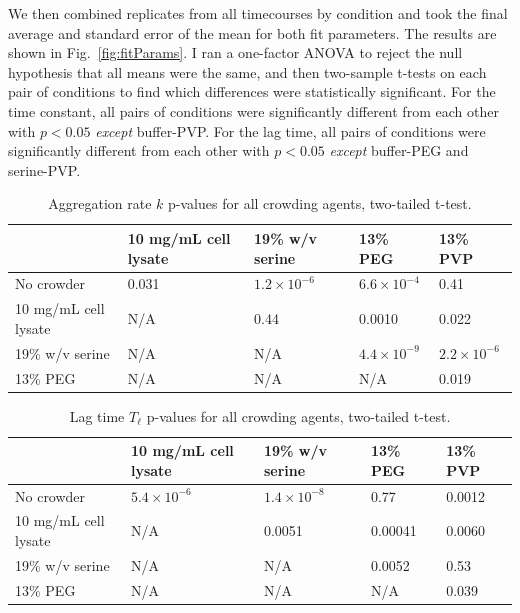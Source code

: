 
We then combined replicates from all timecourses by condition and took the final average and standard error of the mean for both fit parameters.  The results are shown in Fig.~\ref{fig:fitParams}.  I ran a one-factor ANOVA to reject the null hypothesis that all means were the same, and then two-sample t-tests on each pair of conditions to find which differences were statistically significant.  For the time constant, all pairs of conditions were significantly different from each other with $p < 0.05$ \emph{except} buffer-PVP.   For the lag time, all pairs of conditions were significantly different from each other with $p < 0.05$ \emph{except} buffer-PEG and serine-PVP.

\begin{table}[b!]
  \caption[Aggregation rate p-values for all crowding agents.]{Aggregation rate $k$ p-values for all crowding agents, two-tailed t-test.}
    \label{table:p-k-values-all}
    \begin{tabular}{p{4cm}|p{3.5cm}p{3cm}p{2cm}p{2cm}}
        &10 mg/mL cell lysate &  19\% w/v serine & 13\% PEG & 13\% PVP\\
      \hline
	No crowder   & 0.031 & $1.2 \times 10^{-6}$ & $6.6\times 10^{-4}$ &0.41\\
	10 mg/mL cell lysate   & N/A & 0.44 & 0.0010 &  0.022\\
     	19\% w/v serine & N/A  & N/A & $4.4\times 10^{-9}$ & $2.2\times 10^{-6}$\\
      	13\% PEG    & N/A & N/A  & N/A & 0.019\\
    \end{tabular}
\end{table}

\begin{table}[b!]
  \caption[Lag time p-values for all crowding agents.]{Lag time $T_\ell$ p-values for all crowding agents, two-tailed t-test.}
    \label{table:p-tl-values-all}
    \begin{tabular}{p{4cm}|p{3.5cm}p{3cm}p{2cm}p{2cm}}
        &10 mg/mL cell lysate &  19\% w/v serine & 13\% PEG & 13\% PVP\\
      \hline
	No crowder   & $5.4 \times 10^{-6}$ & $1.4 \times 10^{-8}$ & 0.77 &0.0012\\
	10 mg/mL cell lysate   & N/A & 0.0051 & 0.00041 &  0.0060\\
     	19\% w/v serine & N/A  & N/A & 0.0052 & 0.53\\
      	13\% PEG    & N/A & N/A  & N/A & 0.039\\
    \end{tabular}
\end{table}

